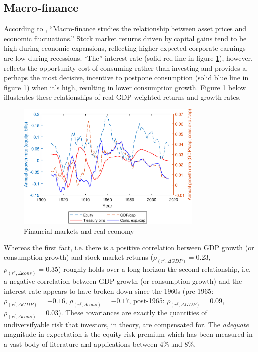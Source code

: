 {{{{\subsection{Macro-finance}
According to \citet{Cochrane2017}, ``Macro-finance studies the relationship between asset prices and economic fluctuations.'' Stock market returns driven by capital gains tend to be high during economic expansions, reflecting higher expected corporate earnings are low during recessions. ``The'' interest rate (solid red line in figure \ref{fig:financial_aggregates_cycles}), however, reflects the opportunity cost of consuming rather than investing and provides a, perhaps the most decisive, incentive to postpone consumption (solid blue line in figure \ref{fig:financial_aggregates_cycles}) when it's high, resulting in lower consumption growth. Figure \ref{fig:financial_aggregates_cycles} below illustrates these relationships of real-GDP weighted returns and growth rates. 
\begin{figure}[ht]
	\centering
  \includegraphics[width=0.8\textwidth]{Matlab Graphics/Figure_10}
	\caption{Financial markets and real economy}
	\label{fig:financial_aggregates_cycles}
\end{figure}
Whereas the first fact, i.e. there is a positive correlation between GDP growth (or consumption growth) and stock market returns ($\rho_{(r^{e}, \Delta GDP)} = 0.23$, $\rho_{(r^{e}, \Delta cons)} = 0.35$) roughly holds over a long horizon the second relationship, i.e. a negative correlation between GDP growth (or consumption growth) and the interest rate appears to have broken down since the 1960s (pre-1965: $\rho_{(r^{f}, \Delta GDP)} = -0.16$, $\rho_{(r^{f}, \Delta cons)} = -0.17$, post-1965: $\rho_{(r^{f}, \Delta GDP)} = 0.09$, $\rho_{(r^{f}, \Delta cons)} = 0.03$). These covariances are exactly the quantities of undiversifyable risk that investors, in theory, are compensated for. The \textit{adequate} magnitude in expectation is the equity risk premium which has been measured in a vast body of literature and applications between 4\% and 8\%.

}}}}
